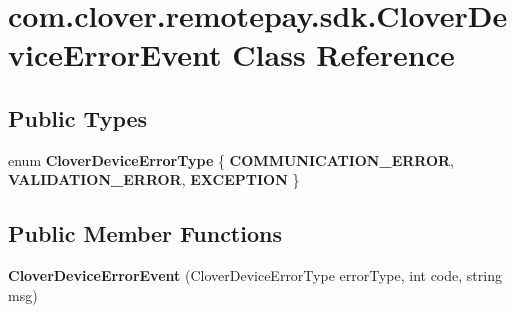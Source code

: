 \hypertarget{classcom_1_1clover_1_1remotepay_1_1sdk_1_1_clover_device_error_event}{}\section{com.\+clover.\+remotepay.\+sdk.\+Clover\+Device\+Error\+Event Class Reference}
\label{classcom_1_1clover_1_1remotepay_1_1sdk_1_1_clover_device_error_event}
\subsection*{Public Types}
\begin{DoxyCompactItemize}
\item 
\mbox{\label{classcom_1_1clover_1_1remotepay_1_1sdk_1_1_clover_device_error_event_a02daf08e6df844b1e25144e6e9f5e422}} 
enum {\bfseries Clover\+Device\+Error\+Type} \{ {\bfseries C\+O\+M\+M\+U\+N\+I\+C\+A\+T\+I\+O\+N\+\_\+\+E\+R\+R\+OR}, 
{\bfseries V\+A\+L\+I\+D\+A\+T\+I\+O\+N\+\_\+\+E\+R\+R\+OR}, 
{\bfseries E\+X\+C\+E\+P\+T\+I\+ON}
 \}
\end{DoxyCompactItemize}
\subsection*{Public Member Functions}
\begin{DoxyCompactItemize}
\item 
\mbox{\label{classcom_1_1clover_1_1remotepay_1_1sdk_1_1_clover_device_error_event_a017c0a1f33363013f6537fdf3790b391}} 
{\bfseries Clover\+Device\+Error\+Event} (Clover\+Device\+Error\+Type error\+Type, int code, string msg)
\end{DoxyCompactItemize}
